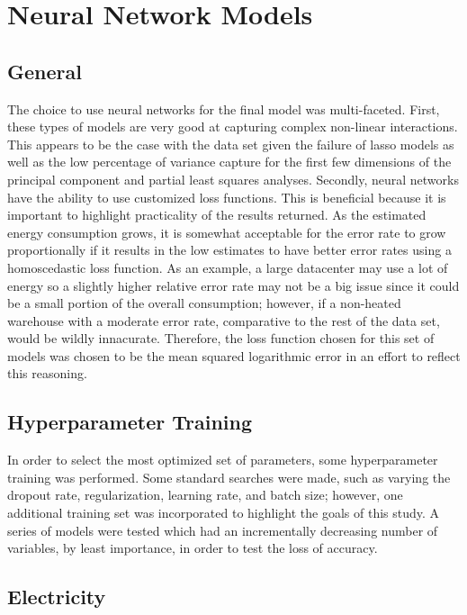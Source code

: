 \section*{Neural Network Models}
\label{sec:nn_models}

\subsection{General}
The choice to use neural networks for the final model was multi-faceted.  First, these types of models are very good at capturing complex non-linear interactions.  This appears to be the case with the data set given the failure of lasso models as well as the low percentage of variance capture for the first few dimensions of the principal component and partial least squares analyses.  Secondly, neural networks have the ability to use customized loss functions.  This is beneficial because it is important to highlight practicality of the results returned.  As the estimated energy consumption grows, it is somewhat acceptable for the error rate to grow proportionally if it results in the low estimates to have better error rates using a homoscedastic loss function.  As an example, a large datacenter may use a lot of energy so a slightly higher relative error rate may not be a big issue since it could be a small portion of the overall consumption; however, if a non-heated warehouse with a moderate error rate, comparative to the rest of the data set, would be wildly innacurate.  Therefore, the loss function chosen for this set of models was chosen to be the mean squared logarithmic error in an effort to reflect this reasoning.

\subsection{Hyperparameter Training}
In order to select the most optimized set of parameters, some hyperparameter training was performed.  Some standard searches were made, such as varying the dropout rate, regularization, learning rate, and batch size; however, one additional training set was incorporated to highlight the goals of this study.  A series of models were tested which had an incrementally decreasing number of variables, by least importance, in order to test the loss of accuracy.
\newpage
\subsection{Electricity}
